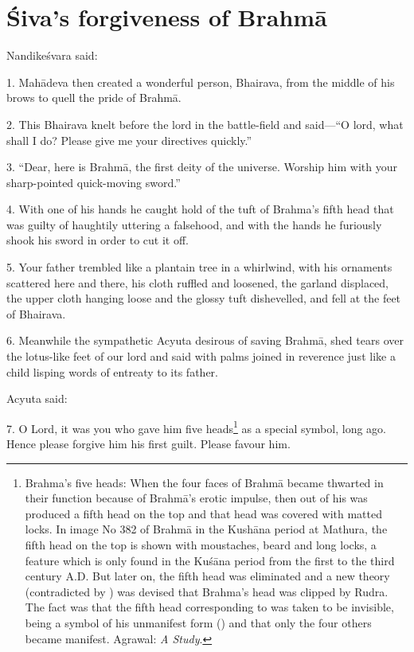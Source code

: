 \chapter{Śiva’s forgiveness of Brahmā}

Nandikeśvara said:

1. Mahādeva then created a wonderful person, Bhairava, from the middle of his
brows to quell the pride of Brahmā.

2. This Bhairava knelt before the lord in the battle-field and said—“O lord,
what shall I do? Please give me your directives quickly.”

3. “Dear, here is Brahmā, the first deity of the universe. Worship him with your
sharp-pointed quick-moving sword.”

4. With one of his hands he caught hold of the tuft of Brahma’s fifth head that
was guilty of haughtily uttering a falsehood, and with the hands he furiously
shook his sword in order to cut it off.

5. Your father trembled like a plantain tree in a whirlwind, with his ornaments
scattered here and there, his cloth ruffled and loosened, the garland displaced,
the upper cloth hanging loose and the glossy tuft dishevelled, and fell at
the feet of Bhairava.

6. Meanwhile the sympathetic Acyuta desirous of saving Brahmā, shed tears over
the lotus-like feet of our lord and said with palms joined in reverence just
like a child lisping words of entreaty to its father.

Acyuta said:

7. O Lord, it was you who gave him five heads\footnote{Brahma’s five heads: When
the four faces of Brahmā became thwarted in their function because of Brahmā’s
erotic impulse, then out of his  was produced a fifth head on the top
and that head was covered with matted locks. In image No 382 of Brahmā in
the Kushāna period at Mathura, the fifth head on the top is shown with
moustaches, beard and long locks, a feature which is only found in the Kuśāna
period from the first to the third century A.D. But later on, the fifth head was
eliminated and a new theory (contradicted by ) was devised
that Brahma’s head was clipped by Rudra. The fact was that the fifth head
corresponding to  was taken to be invisible, being a symbol of his
unmanifest form () and that only the four others became
manifest. Agrawal: \emph{A Study}.} as a special symbol, long ago.
Hence please forgive him his first guilt. Please favour him.

